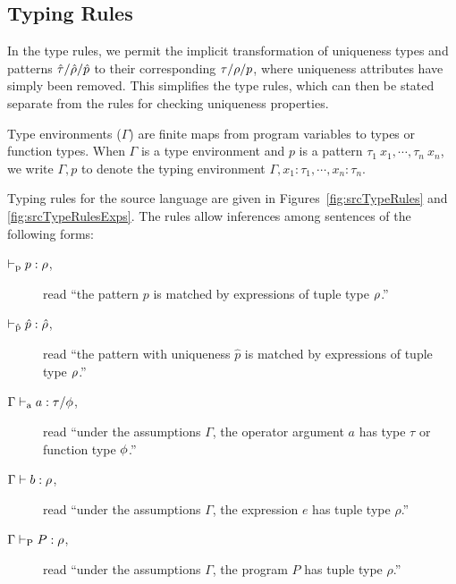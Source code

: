 \subsection{Typing Rules}

In the type rules, we permit the implicit transformation of uniqueness
types and patterns $\hat{\tau}/\hat{\rho}/\hat{p}$ to their corresponding
$\tau/\rho/p$, where uniqueness attributes have simply been removed.
This simplifies the type rules, which can then be stated separate from
the rules for checking uniqueness properties.

Type environments ($\Gamma$) are finite
maps from program variables to types or function types. When $\Gamma$
is a type environment and $p$ is a pattern
$\tau_1~x_1,\cdots,\tau_n~x_n$, we write $\Gamma,p$ to denote the
typing environment $\Gamma,x_1:\tau_1,\cdots,x_n:\tau_n$.

Typing rules for the source language are given in
Figures~\ref{fig:srcTypeRules} and \ref{fig:srcTypeRulesExps}.  The
rules allow inferences among sentences of the following forms:

\begin{description}
\item[$\vdash_\textrm{p} p : \rho$,] read ``the pattern $p$ is matched by
  expressions of tuple type $\rho$.''
\item[$\vdash_{\hat{\textrm{p}}} \hat{p} : \hat{\rho}$,] read ``the pattern with uniqueness
  $\hat{p}$ is matched by expressions of tuple type $\rho$.''
\item[$\Gamma \vdash_\textrm{a} a : \tau / \phi$,] read ``under the assumptions
$\Gamma$, the operator argument $a$ has type $\tau$ or function type
$\phi$.''
\item[$\Gamma \vdash b : \rho$,] read ``under the assumptions $\Gamma$,
  the expression $e$ has tuple type $\rho$.''
\item[$\Gamma \vdash_\textrm{P} P : \rho$,] read ``under the assumptions
$\Gamma$, the program $P$ has tuple type $\rho$.''
\end{description}

